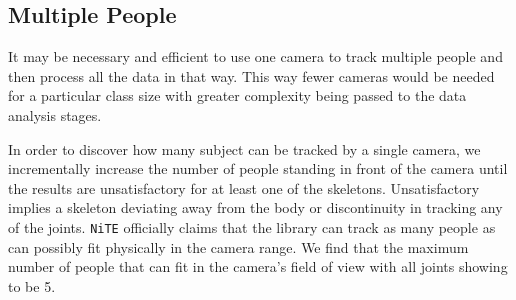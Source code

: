 \documentclass[11pt,a4paper]{article}
\begin{document}
\subsection{Multiple People}
\noindent
It may be necessary and efficient to use one camera to track multiple people and then process all the data in that way. This way fewer cameras would be needed for a particular class size with greater complexity being passed to the data analysis stages. 
 
\noindent
In order to discover how many subject can be tracked by a single camera, we incrementally increase the number of people standing in front of the camera until the results are unsatisfactory for at least one of the skeletons. Unsatisfactory implies a skeleton deviating away from the body or discontinuity in tracking any of the joints. \texttt{NiTE} officially claims that the library can track as many people as can possibly fit physically in the camera range. We find that the maximum number of people that can fit in the camera's field of view with all joints showing to be 5. 
 
\end{document}
